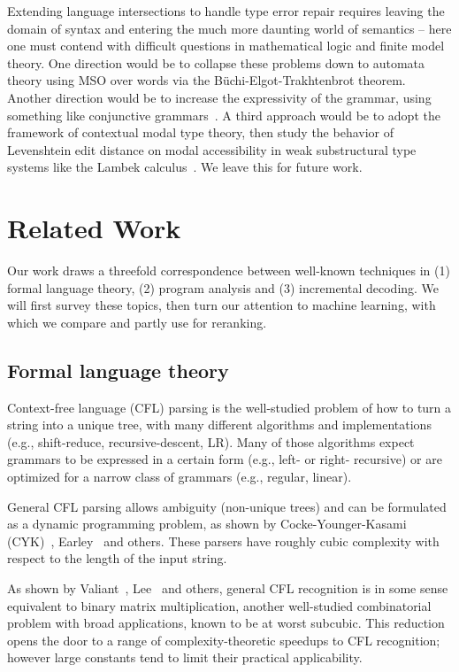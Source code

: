 \documentclass[sigplan,acmsmall,nonacm,screen]{acmart}\settopmatter{printfolios=false,printccs=false,printacmref=false}
\begin{document}
Extending language intersections to handle type error repair requires leaving the domain of syntax and entering the much more daunting world of semantics -- here one must contend with difficult questions in mathematical logic and finite model theory. One direction would be to collapse these problems down to automata theory using MSO over words via the B\"uchi-Elgot-Trakhtenbrot theorem. Another direction would be to increase the expressivity of the grammar, using something like conjunctive grammars~\cite{okhotin2001conjunctive}. A third approach would be to adopt the framework of contextual modal type theory, then study the behavior of Levenshtein edit distance on modal accessibility in weak substructural type systems like the Lambek calculus~\cite{pshenitsyn2025first}. We leave this for future work.

\clearpage\section{Related Work}\label{sec:related}

Our work draws a threefold correspondence between well-known techniques in (1) formal language theory, (2) program analysis and (3) incremental decoding. We will first survey these topics, then turn our attention to machine learning, with which we compare and partly use for reranking.

\subsection{Formal language theory}

Context-free language (CFL) parsing is the well-studied problem of how to turn a string into a unique tree, with many different algorithms and implementations (e.g., shift-reduce, recursive-descent, LR). Many of those algorithms expect grammars to be expressed in a certain form (e.g., left- or right- recursive) or are optimized for a narrow class of grammars (e.g., regular, linear).

General CFL parsing allows ambiguity (non-unique trees) and can be formulated as a dynamic programming problem, as shown by Cocke-Younger-Kasami (CYK)~\cite{sakai1961syntax}, Earley~\cite{earley1970efficient} and others. These parsers have roughly cubic complexity with respect to the length of the input string.

As shown by Valiant~\cite{valiant1975general}, Lee~\cite{lee2002fast} and others, general CFL recognition is in some sense equivalent to binary matrix multiplication, another well-studied combinatorial problem with broad applications, known to be at worst subcubic. This reduction opens the door to a range of complexity-theoretic speedups to CFL recognition; however large constants tend to limit their practical applicability.
\end{document}
